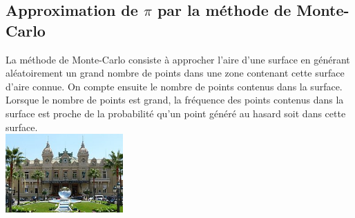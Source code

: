 \documentclass[a4paper,11pt,exos]{nsi} %
\begin{document}
\newpage
\subsection*{Approximation de $\pi$ par la méthode de Monte-Carlo}
La méthode de Monte-Carlo consiste à approcher l'aire d'une surface en générant aléatoirement un grand nombre de points dans une zone contenant cette surface d'aire connue. On compte ensuite le nombre de points contenus dans la surface.\\
Lorsque le nombre de points est grand, la fréquence des points contenus dans la surface est proche de la probabilité qu'un point généré au hasard soit dans cette surface.\\

{\includegraphics[width=4.5cm]{Monaco_-_panoramio_(138).jpg}}
\vspace*{.5cm}
\end{document}
